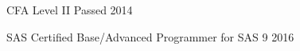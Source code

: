 \documentclass[11pt, a4paper]{awesome-cv}
\begin{document}
\begin{cvhonors}

  \cvhonor
    {CFA Level II Passed} %
    {} %
    {} %
    {2014} %

\end{cvhonors}




\begin{cvhonors}

  \cvhonor
    {SAS Certified Base/Advanced Programmer for SAS 9} %
    {} %
    {} %
    {2016} %

\end{cvhonors}

\end{document}
